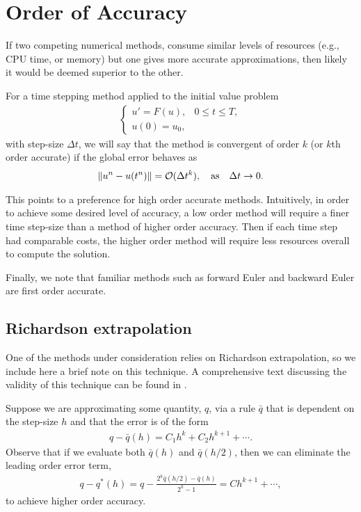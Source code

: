 \section{Order of Accuracy}
If two competing numerical methods, consume similar levels of resources (e.g., CPU time, or memory) but one gives more accurate approximations, then likely it would be deemed superior to the other. 

For a time stepping method applied to the initial value problem 
\begin{align}
\begin{cases}
        u' = F(u), & 0\leq t \leq T, \\
 u(0) = u_0, 
\end{cases}
\end{align}
with step-size $\Delta t$, 
we will say that the method is convergent of order $k$ (or $k$th order accurate) if the global error behaves as 
\begin{align}
        \left\lVert u^{n} - u(t^n)\right\rVert = \mathcal{O}(\Delta t^k),
\quad\text{as}\quad \Delta t \to 0.
\end{align}

This points to a preference for high order accurate methods. Intuitively, in order to achieve some desired level of accuracy, a low order method will require a finer time step-size than a method of higher order accuracy. Then if each time step had comparable costs, the higher order method will require less resources overall to compute the solution. 

Finally, we note that familiar methods such as forward Euler and backward Euler are first order accurate.

\subsection{Richardson extrapolation}
One of the methods under consideration relies on Richardson extrapolation, so we include here a brief note on this technique. A comprehensive text discussing the validity of this technique can be found in \cite{sidi2003practical}.

Suppose we are approximating some quantity, $q$, via a rule $\bar q$ that is dependent on the step-size $h$ and that the error is of the form 
\begin{align}
        q - \bar q(h) = C_1 h^k  + C_2 h^{k+1} + \cdots.
\end{align}
Observe that if we evaluate both $\bar q(h)$ and $\bar q(h/2)$, then we can eliminate the leading order error term,
\begin{align}
        q-q^*(h) = q-\frac{2^k \bar q(h/2)  -\bar q(h)}{2^k-1} 
= Ch^{k+1} + \cdots ,
\end{align}
to achieve higher order accuracy.

